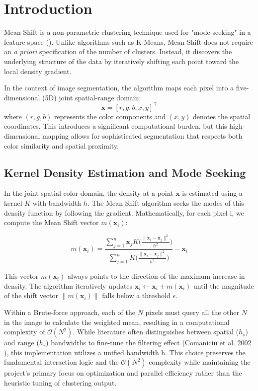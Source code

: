 \documentclass[10pt,twocolumn,letterpaper]{article}
\begin{document}
\section{Introduction}
Mean Shift\cite{first_mean_shift} is a non-parametric clustering technique used for "mode-seeking" in a feature space (). Unlike algorithms such as K-Means\cite{macqueen1967multivariate}, Mean Shift does not require an \textit{a priori} specification of the number of clusters.  Instead, it discovers the underlying structure of the data by iteratively shifting each point toward the local density gradient.

In the context of image segmentation, the algorithm maps each pixel into a five-dimensional (5D) joint spatial-range domain:
$$\mathbf{x} = [r, g, b, x, y]^\top$$ 
where $(r, g, b)$ represents the color components and $(x, y)$ denotes the spatial coordinates.  This  introduces a significant computational burden, but this high-dimensional mapping allows for sophisticated segmentation that respects both color similarity and spatial proximity.

\subsection{Kernel Density Estimation and Mode Seeking}
In the joint spatial-color domain, the density at a point $\pmb x$ is estimated using a kernel $K$ with bandwidth $h$. The Mean Shift algorithm seeks the modes of this density function by following the gradient. Mathematically, for each pixel i, we compute the Mean Shift vector $m(\pmb x_i)$:

$$m(\pmb x_i)=\frac{\sum_{j=1}^n\pmb x_jK\bigg(\frac{\|\pmb x_i-\pmb x_j\|^2}{h^2}\bigg)}{\sum_{j=1}^nK\bigg(\frac{\|\pmb x_i-\pmb x_j\|^2}{h^2}\bigg)}-\pmb x_i$$

This vector $m(\pmb x_i)$ always points to the direction of the maximum increase in density. The algorithm iteratively updates $\pmb x_i\gets \pmb x_i+m(\pmb x_i)$ until the magnitude of the shift  vector $\|m(\pmb x_i)\|$ falls below a threshold $\epsilon$.

Within a Brute-force approach, each of the $N$ pixels must query all the other $N$ in the image to calculate the weighted mean, resulting in a computational complexity of $\mathcal O(N^2)$. While literature often distinguishes between spatial ($h_s$) and range ($h_r$) bandwidths  to fine-tune the filtering effect (Comaniciu et al. 2002 \cite{double_bandwidth}), this implementation utilizes a unified bandwidth h. This choice preserves the fundamental interaction logic and the $\mathcal O(N^2)$ complexity while maintaining the project's primary focus on  optimization and parallel efficiency rather than the heuristic tuning of clustering output. 
\end{document}
